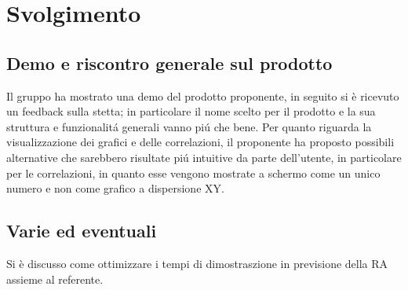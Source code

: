 \newpage
\section*{Svolgimento}

	\subsection*{Demo e riscontro generale sul prodotto}
		Il gruppo ha mostrato una demo del prodotto proponente, in seguito si è ricevuto un feedback sulla stetta; in particolare il nome scelto per il prodotto e la sua struttura e funzionalitá generali vanno piú che bene. Per quanto riguarda la visualizzazione dei grafici e delle correlazioni, il proponente ha proposto possibili alternative che sarebbero risultate piú intuitive da parte dell'utente, in particolare per le correlazioni, in quanto esse vengono mostrate a schermo come un unico numero e non come grafico a dispersione XY.

	\subsection*{Varie ed eventuali}
		Si è discusso come ottimizzare i tempi di dimostraszione in previsione della RA assieme al referente.
